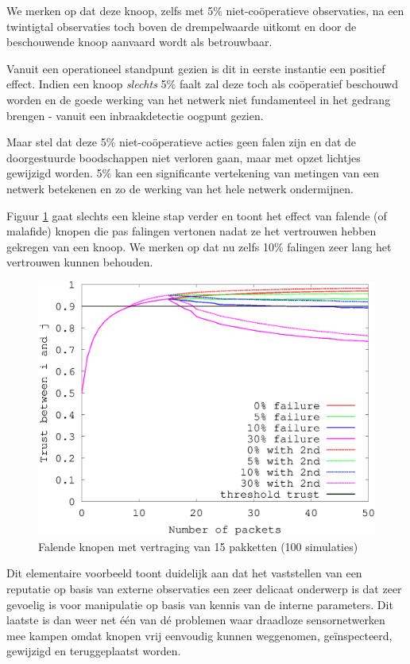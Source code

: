 We merken op dat deze knoop, zelfs met 5\% niet-co\"operatieve observaties, na
een twintigtal observaties toch boven de drempelwaarde uitkomt en door de
beschouwende knoop aanvaard wordt als betrouwbaar.

Vanuit een operationeel standpunt gezien is dit in eerste instantie een
positief effect. Indien een knoop \emph{slechts} 5\% faalt zal deze toch als
co\"operatief beschouwd worden en de goede werking van het netwerk niet
fundamenteel in het gedrang brengen - vanuit een inbraakdetectie oogpunt gezien.

Maar stel dat deze 5\% niet-co\"operatieve acties geen falen zijn en dat de
doorgestuurde boodschappen niet verloren gaan, maar met opzet lichtjes
gewijzigd worden. 5\% kan een significante vertekening van metingen van een
netwerk betekenen en zo de werking van het hele netwerk ondermijnen.

Figuur \ref{fig:reputation-malicious} gaat slechts een kleine stap verder en
toont het effect van falende (of malafide) knopen die pas falingen vertonen
nadat ze het vertrouwen hebben gekregen van een knoop. We merken op dat nu zelfs
10\% falingen zeer lang het vertrouwen kunnen behouden.

\begin{figure}[h]
 \centering
 \includegraphics[width=.5\linewidth]{./resources/reputation-malicious.eps}
 \caption{Falende knopen met vertraging van 15 pakketten (100 simulaties)}
 \label{fig:reputation-malicious}
\end{figure}

Dit elementaire voorbeeld toont duidelijk aan dat het vaststellen van een
reputatie op basis van externe observaties een zeer delicaat onderwerp is dat
zeer gevoelig is voor manipulatie op basis van kennis van de interne
parameters. Dit laatste is dan weer net \'e\'en van d\'e problemen waar
draadloze sensornetwerken mee kampen omdat knopen vrij eenvoudig kunnen
weggenomen, ge\"inspecteerd, gewijzigd en teruggeplaatst worden.
